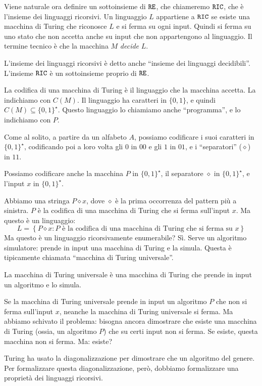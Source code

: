 Viene naturale ora definire un sottoinsieme di $\texttt{RE}$, che chiameremo $\texttt{RIC}$, che \`e l'insieme dei linguaggi ricorsivi. Un linguaggio $L$ appartiene a $\texttt{RIC}$ se esiste una macchina di Turing che riconosce $L$ e si ferma su ogni input. Quindi si ferma su uno stato che non accetta anche su input che non appartengono al linguaggio. Il termine tecnico \`e che la macchina $M$ \emph{decide} $L$.

L'insieme dei linguaggi ricorsivi \`e detto anche ``insieme dei linguaggi decidibili''. L'insieme $\texttt{RIC}$ \`e un sottoinsieme proprio di $\texttt{RE}$.

La codifica di una macchina di Turing \`e il linguaggio che la macchina accetta. La indichiamo con $C(M)$. Il linguaggio ha caratteri in $\{0,1\}$, e quindi $C(M) \subseteq \{0,1\}^{\star}$. Questo linguaggio lo chiamiamo anche ``programma'', e lo indichiamo con $P$.

Come al solito, a partire da un alfabeto $A$, possiamo codificare i suoi caratteri in $\{0,1\}^{\star}$, codificando poi a loro volta gli $0$ in $00$ e gli $1$ in $01$, e i ``separatori'' ($\diamond$) in $11$.

Possiamo codificare anche la macchina $P$ in $\{0,1\}^{\star}$, il separatore $\diamond$ in $\{0,1\}^{\star}$, e l'input $x$ in $\{0,1\}^{\star}$.

Abbiamo una stringa $P \diamond x$, dove $\diamond$ \`e la prima occorrenza del pattern pi\`u a sinistra. $P$ \`e la codifica di una macchina di Turing che si ferma sull'input $x$. Ma questo \`e un linguaggio:
\[
L = \left\{ P \diamond x : P \text{ \`e la codifica di una macchina di Turing che si ferma su } x \right\}
\]
Ma questo \`e un linguaggio ricorsivamente enumerabile? S\`i. Serve un algoritmo simulatore: prende in input una macchina di Turing e la simula. Questa \`e tipicamente chiamata ``macchina di Turing universale''.

La macchina di Turing universale \`e una macchina di Turing che prende in input un algoritmo e lo simula.

Se la macchina di Turing universale prende in input un algoritmo $P$ che non si ferma sull'input $x$, neanche la macchina di Turing universale si ferma. Ma abbiamo schivato il problema: bisogna ancora dimostrare che esiste una macchina di Turing (ossia, un algoritmo $P$) che su certi input non si ferma. Se esiste, questa macchina non si ferma. Ma: esiste?

Turing ha usato la diagonalizzazione per dimostrare che un algoritmo del genere. Per formalizzare questa diagonalizzazione, per\`o, dobbiamo formalizzare una propriet\`a dei linguaggi ricorsivi.

